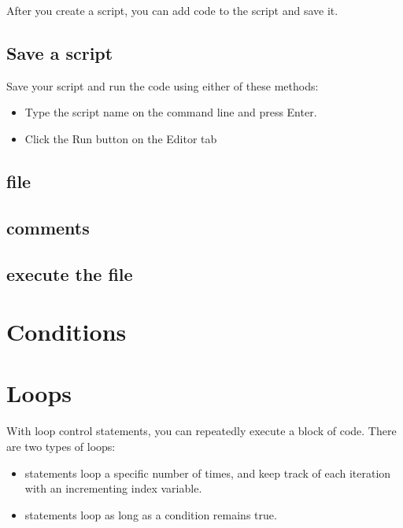 After you create a script, you can add code to the script and save it.

\subsection{Save a script}
Save your script and run the code using either of these methods:

\begin{itemize}
	\item Type the script name on the command line and press Enter. 
	\item Click the Run  button on the Editor tab
\end{itemize}

\subsection{file}
\subsection{comments}
\subsection{execute the file}
\section{Conditions}


\section{Loops}
With loop control statements, you can repeatedly execute a block of code. 
There are two types of loops:
\begin{itemize}
	\item {} statements loop a specific number of times, and keep track of each iteration with an incrementing index variable.
	\item {} statements loop as long as a condition remains true.
\end{itemize}




